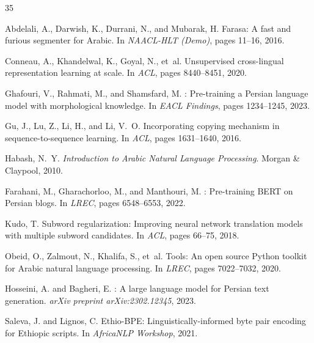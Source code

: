 \documentclass[11pt,a4paper]{article}
\begin{document}
\begin{thebibliography}{35}

Abdelali, A., Darwish, K., Durrani, N., and Mubarak, H.
\newblock Farasa: A fast and furious segmenter for {Arabic}.
\newblock In \emph{NAACL-HLT (Demo)}, pages 11--16, 2016.

Conneau, A., Khandelwal, K., Goyal, N., et~al.
\newblock Unsupervised cross-lingual representation learning at scale.
\newblock In \emph{ACL}, pages 8440--8451, 2020.

Ghafouri, V., Rahmati, M., and Shamsfard, M.
: Pre-training a {Persian} language model with morphological knowledge.
\newblock In \emph{EACL Findings}, pages 1234--1245, 2023.

Gu, J., Lu, Z., Li, H., and Li, V.~O.
\newblock Incorporating copying mechanism in sequence-to-sequence learning.
\newblock In \emph{ACL}, pages 1631--1640, 2016.

Habash, N.~Y.
\newblock \emph{Introduction to {Arabic} Natural Language Processing}.
\newblock Morgan \& Claypool, 2010.

Farahani, M., Gharachorloo, M., and Manthouri, M.
: Pre-training {BERT} on {Persian} blogs.
\newblock In \emph{LREC}, pages 6548--6553, 2022.

Kudo, T.
\newblock Subword regularization: Improving neural network translation models with multiple subword candidates.
\newblock In \emph{ACL}, pages 66--75, 2018.

Obeid, O., Zalmout, N., Khalifa, S., et~al.
 Tools: An open source {Python} toolkit for {Arabic} natural language processing.
\newblock In \emph{LREC}, pages 7022--7032, 2020.

Hosseini, A. and Bagheri, E.
: A large language model for {Persian} text generation.
\newblock \emph{arXiv preprint arXiv:2302.12345}, 2023.

Saleva, J. and Lignos, C.
\newblock Ethio-{BPE}: Linguistically-informed byte pair encoding for {Ethiopic} scripts.
\newblock In \emph{AfricaNLP Workshop}, 2021.


\end{thebibliography}
\end{document}
